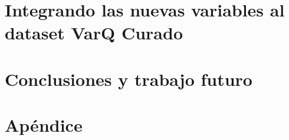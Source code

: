 \documentclass[11pt,a4paper,twoside]{tesis}
\begin{document}
\chapter{Integrando las nuevas variables al dataset VarQ Curado}
\label{ch:desarrollo_integral_varq}


\chapter{Conclusiones y trabajo futuro}
\label{ch:conclusiones}



\backmatter





\chapter{Apéndice}
\label{ch:apendice}

\end{document}
